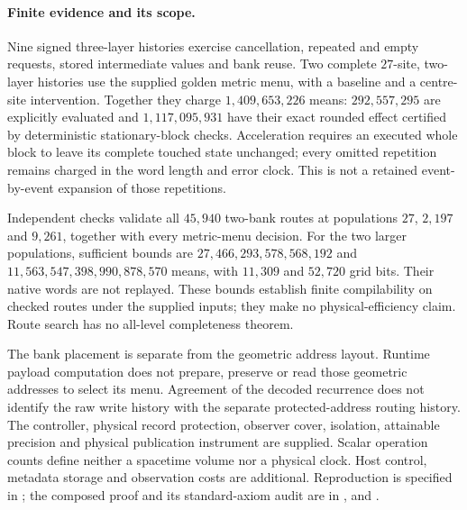 \paragraph{Finite evidence and its scope.}
Nine signed three-layer histories exercise cancellation, repeated and empty
requests, stored intermediate values and bank reuse. Two complete $27$-site,
two-layer histories use the supplied golden metric menu, with a baseline
and a centre-site intervention. Together they charge $1{,}409{,}653{,}226$
means: $292{,}557{,}295$ are explicitly evaluated and $1{,}117{,}095{,}931$
have their exact rounded effect certified by deterministic stationary-block
checks. Acceleration requires an executed whole block to leave its complete
touched state unchanged; every omitted repetition remains charged in the
word length and error clock. This is not a retained event-by-event expansion
of those repetitions.

Independent checks validate all $45{,}940$ two-bank routes at populations
$27$, $2{,}197$ and $9{,}261$, together with every metric-menu decision.
For the two larger populations, sufficient bounds are
$27{,}466{,}293{,}578{,}568{,}192$ and
$11{,}563{,}547{,}398{,}990{,}878{,}570$ means, with $11{,}309$ and
$52{,}720$ grid bits. Their native words are not replayed. These bounds
establish finite compilability on checked routes under the supplied inputs;
they make no physical-efficiency claim. Route search has no all-level
completeness theorem.

The bank placement is separate from the geometric address layout. Runtime
payload computation does not prepare, preserve or read those geometric
addresses to select its menu. Agreement of the decoded recurrence does not
identify the raw write history with the separate protected-address routing
history. The controller, physical record protection,
observer cover, isolation, attainable precision and physical publication
instrument are supplied. Scalar operation counts define neither a
spacetime volume nor a physical clock. Host control, metadata storage and
observation costs are additional. Reproduction is specified in
; the composed proof and its standard-axiom
audit are in ,
 and
.
